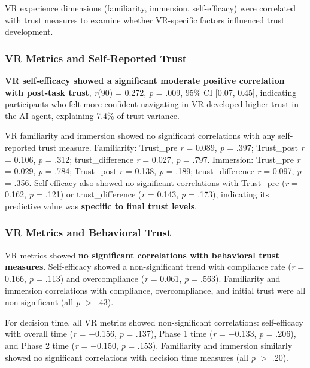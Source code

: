 \documentclass[12pt]{article}
\begin{document}
VR experience dimensions (familiarity, immersion, self-efficacy) were correlated with trust measures to examine whether VR-specific factors influenced trust development.

\subsubsection{VR Metrics and Self-Reported Trust}

\textbf{VR self-efficacy showed a significant moderate positive correlation with post-task trust}, \textit{r}(90) = 0.272, \textit{p} = .009, 95\% CI [0.07, 0.45], indicating participants who felt more confident navigating in VR developed higher trust in the AI agent, explaining 7.4\% of trust variance.

VR familiarity and immersion showed no significant correlations with any self-reported trust measure. Familiarity: Trust\_pre \textit{r} = 0.089, \textit{p} = .397; Trust\_post \textit{r} = 0.106, \textit{p} = .312; trust\_difference \textit{r} = 0.027, \textit{p} = .797. Immersion: Trust\_pre \textit{r} = 0.029, \textit{p} = .784; Trust\_post \textit{r} = 0.138, \textit{p} = .189; trust\_difference \textit{r} = 0.097, \textit{p} = .356. Self-efficacy also showed no significant correlations with Trust\_pre (\textit{r} = 0.162, \textit{p} = .121) or trust\_difference (\textit{r} = 0.143, \textit{p} = .173), indicating its predictive value was \textbf{specific to final trust levels}.

\subsubsection{VR Metrics and Behavioral Trust}

VR metrics showed \textbf{no significant correlations with behavioral trust measures}. Self-efficacy showed a non-significant trend with compliance rate (\textit{r} = 0.166, \textit{p} = .113) and overcompliance (\textit{r} = 0.061, \textit{p} = .563). Familiarity and immersion correlations with compliance, overcompliance, and initial trust were all non-significant (all \textit{p} $>$ .43).

For decision time, all VR metrics showed non-significant correlations: self-efficacy with overall time (\textit{r} = $-$0.156, \textit{p} = .137), Phase 1 time (\textit{r} = $-$0.133, \textit{p} = .206), and Phase 2 time (\textit{r} = $-$0.150, \textit{p} = .153). Familiarity and immersion similarly showed no significant correlations with decision time measures (all \textit{p} $>$ .20).
\end{document}
